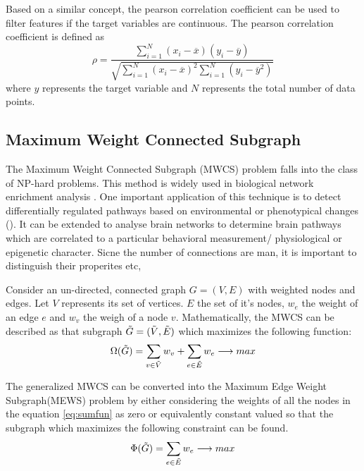 \documentclass[msthesis.tex]{subfiles}
\begin{document}
Based on a similar concept, the pearson correlation coefficient can be used to filter features if the target variables are continuous. The pearson correlation coefficient is defined as 
\begin{equation}
    \rho = \frac{\sum_{i=1}^{N} (x_{i} - \overline{x}) (y_{i} - \overline{y})}
    {\sqrt{\sum_{i=1}^{N} (x_{i}-\overline{x})^2 \sum_{i=1}^{N} (y_{i}-\overline{y}^2)}}
\end{equation}
where $y$ represents the target variable and $N$ represents the total number of data points. 


\subsection{Maximum Weight Connected Subgraph}
\label{sec:MEWS}
The Maximum Weight Connected Subgraph (MWCS) problem falls into the class of NP-hard problems. This method is widely used in biological network enrichment analysis \cite{DBLP:journals/corr/LobodaAS16}. One important application of this technique is to detect
differentially regulated pathways based on environmental or phenotypical changes (\cite{althaus2014algorithms}). It can be extended to analyse brain networks to determine brain pathways which are correlated to a particular behavioral measurement/ physiological or epigenetic character. Sicne the number of connections are man, it is important to distinguish their properites etc, 

Consider an un-directed, connected graph $G = (V,E)$ with weighted nodes and edges. Let $V$ represents its set of vertices. $E$ the set of it's nodes, $w_e$ the weight of an edge $e$ and $w_v$ the weigh of a node $v$. Mathematically, the MWCS can be described as that subgraph  $\Tilde{G} = (\Tilde{V}, \Tilde{E})$ which maximizes the following function:
\begin{equation}
\label{eq:sumfun}
    \Omega(\Tilde{G}) = \sum_{v \in \Tilde{V}} w_v + \sum_{e \in \Tilde{E}} w_e \longrightarrow max
\end{equation}

The generalized MWCS can be converted into the Maximum Edge Weight Subgraph(MEWS) problem by either considering the weights of all the nodes in the equation \ref{eq:sumfun} as zero or equivalently constant valued so that the subgraph which maximizes the following constraint can be found.
\begin{equation}
    \label{eq:sumews}
    \Phi(\Tilde{G}) = \sum_{e \in \Tilde{E}} w_e \longrightarrow max
\end{equation}
\end{document}

